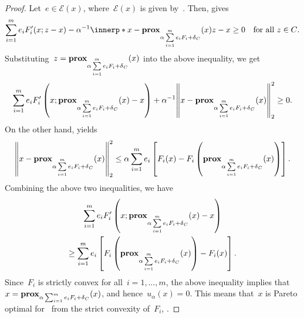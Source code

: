 \documentclass[../../main]{subfiles}
\begin{document}
\begin{proof}
    Let~$e \in \mathcal{E}(x)$, where~$\mathcal{E}(x)$ is given by~.
    Then,  gives
    \begin{equation}
        \sum_{i = 1}^{m} e_i F_i'(x; z - x) - \alpha^{-1} \innerp*{ x - \prox_{\alpha \sum\limits_{i = 1}^{m} e_i F_i + \indicator_C}(x) }{z - x} \ge 0 \forallcondition{z \in C}
    .\end{equation} 
    Substituting~$z = \prox_{\alpha \sum\limits_{i = 1}^{m} e_i F_i + \indicator_C}(x)$ into the above inequality, we get
    \begin{equation}
        \sum_{i = 1}^{m} e_i F_i' \left(x; \prox_{\alpha \sum\limits_{i = 1}^{m} e_i F_i + \indicator_C}(x) - x \right) + \alpha^{-1} \norm*{ x - \prox_{\alpha \sum\limits_{i = 1}^{m} e_i F_i + \indicator_C}(x) }_2^2 \ge 0
    .\end{equation}
    On the other hand,  yields
    \begin{equation}
        \norm*{x - \prox_{\alpha \sum\limits_{i = 1}^{m} e_i F_i + \indicator_C}(x)}_2^2 \le \alpha \sum_{i = 1}^{m} e_i \left[ F_i(x) - F_i\left(\prox_{\alpha \sum\limits_{i = 1}^{m} e_i F_i + \indicator_C}(x)\right) \right] 
    .\end{equation}
    Combining the above two inequalities, we have
    \begin{multline}
        \sum_{i = 1}^{m} e_i F_i' \left(x; \prox_{\alpha \sum\limits_{i = 1}^{m} e_i F_i + \indicator_C}(x) - x \right) \\
        \ge \sum_{i = 1}^{m} e_i \left[ F_i\left(\prox_{\alpha \sum\limits_{i = 1}^{m} e_i F_i + \indicator_C}(x)\right) - F_i(x) \right] 
    .\end{multline}
    Since~$F_i$ is strictly convex for all~$i = 1, \dots, m$, the above inequality implies that~$x = \prox_{\alpha \sum_{i = 1}^{m} e_i F_i + \indicator_C}(x)$, and hence~$u_\alpha(x) = 0$.
    This means that~$x$ is Pareto optimal for~ from the strict convexity of~$F_i$, .
\end{proof}
\end{document}

